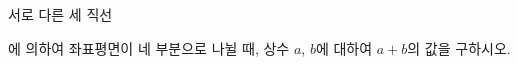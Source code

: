 서로 다른 세 직선\par\smallskip{}\par\smallskip\noindent 에 의하여 좌표평면이 네 부분으로 나뉠 때, 상수 $a$, $b$에 대하여 $a+b$의 값을 구하시오.
